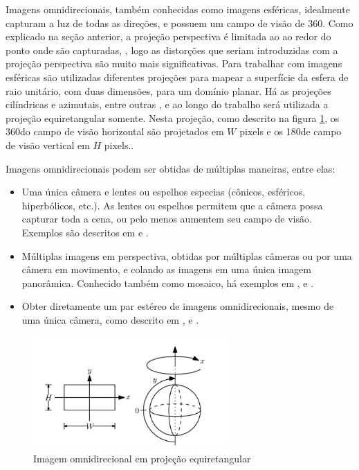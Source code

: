 \documentclass[cic,tc]{iiufrgs}
\begin{document}
Imagens omnidirecionais, também conhecidas como imagens esféricas, idealmente capturam a luz de todas as direções, e possuem um campo de visão de 360\degree. Como explicado na seção anterior, a projeção perspectiva é limitada ao  ao redor do ponto onde são capturadas, , logo as distorções que seriam introduzidas com a projeção perspectiva são muito mais significativas. Para trabalhar com imagens esféricas são utilizadas diferentes projeções para mapear a superfície da esfera de raio unitário, com duas dimensões, para um domínio planar. Há as projeções cilíndricas e azimutais, entre outras , e ao longo do trabalho será utilizada a projeção equiretangular somente. Nesta projeção, como descrito na figura \ref{fig:sphericalIm}, os 360\degree  do campo de visão horizontal são projetados em $W$ pixels e os 180\degree de campo de visão vertical em $H$ pixels.. 

Imagens omnidirecionais podem ser obtidas de múltiplas maneiras, entre elas:
\begin{itemize}
\item Uma única câmera e lentes ou espelhos especias (cônicos, esféricos, hiperbólicos, etc.). As lentes ou espelhos permitem que a câmera possa capturar toda a cena, ou pelo menos aumentem seu campo de visão. Exemplos são descritos em \citet{omniSingleCam1997} e \citet{omniSingleCam1998}.
\item Múltiplas imagens em perspectiva, obtidas por múltiplas câmeras ou por uma câmera em movimento, e colando as imagens em uma única imagem panorâmica. Conhecido também como mosaico, há exemplos em \citet{omniMultiCam1994}, \citet{omniMultiCam1996} e \citet{omniMultiCam1997}.
\item Obter diretamente um par estéreo de imagens omnidirecionais, mesmo de uma única câmera, como descrito em \citet{omniStereoCam1999}, \citep{omniStereoCam2013} e \citet{omniStereoCam2016}. 
\end{itemize}


\begin{figure}
    \caption{Imagem omnidirecional em projeção equiretangular}
    \begin{center}
        \includegraphics[width=20em]{equiretangular.png}
    \end{center}
    \label{fig:sphericalIm}
\end{figure}
\end{document}
